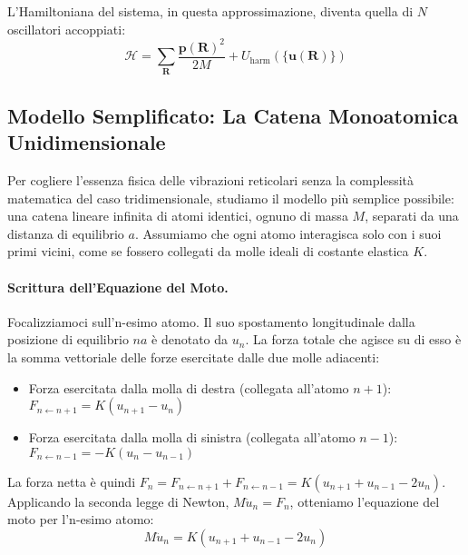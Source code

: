 L'Hamiltoniana del sistema, in questa approssimazione, diventa quella di \(N\) oscillatori accoppiati:
\[ \mathcal{H} = \sum_{\mathbf{R}} \frac{\mathbf{p}(\mathbf{R})^2}{2M} + U_{\text{harm}}(\lbrace \mathbf{u}(\mathbf{R}) \rbrace) \]

\subsection{Modello Semplificato: La Catena Monoatomica Unidimensionale}
Per cogliere l'essenza fisica delle vibrazioni reticolari senza la complessità matematica del caso tridimensionale, studiamo il modello più semplice possibile: una catena lineare infinita di atomi identici, ognuno di massa \(M\), separati da una distanza di equilibrio \(a\). Assumiamo che ogni atomo interagisca solo con i suoi primi vicini, come se fossero collegati da molle ideali di costante elastica \(K\).

\paragraph{Scrittura dell'Equazione del Moto.}
Focalizziamoci sull'n-esimo atomo. Il suo spostamento longitudinale dalla posizione di equilibrio \(na\) è denotato da \(u_n\). La forza totale che agisce su di esso è la somma vettoriale delle forze esercitate dalle due molle adiacenti:
\begin{itemize}
    \item Forza esercitata dalla molla di destra (collegata all'atomo \(n+1\)): \(F_{n \leftarrow n+1} = K(u_{n+1} - u_n)\)
    \item Forza esercitata dalla molla di sinistra (collegata all'atomo \(n-1\)): \(F_{n \leftarrow n-1} = -K(u_n - u_{n-1})\)
\end{itemize}
La forza netta è quindi \(F_n = F_{n \leftarrow n+1} + F_{n \leftarrow n-1} = K(u_{n+1} + u_{n-1} - 2u_n)\).
Applicando la seconda legge di Newton, \(M\ddot{u}_n = F_n\), otteniamo l'equazione del moto per l'n-esimo atomo:
\[ M \ddot{u}_n = K(u_{n+1} + u_{n-1} - 2u_n) \]

